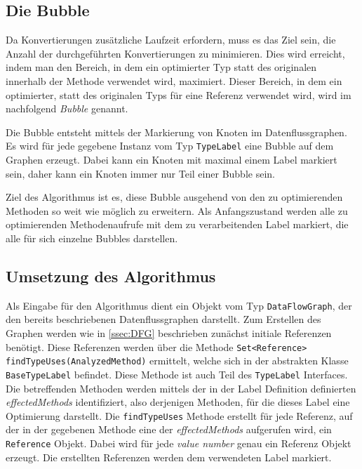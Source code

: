 \subsection{Die Bubble}

Da Konvertierungen zusätzliche Laufzeit erfordern, muss es das Ziel sein, die Anzahl 
der durchgeführten Konvertierungen zu minimieren. Dies wird erreicht, indem man den
Bereich, in dem ein optimierter Typ statt des originalen innerhalb der Methode 
verwendet wird, maximiert. Dieser Bereich, in dem ein optimierter, statt des originalen 
Typs für eine Referenz verwendet wird, wird im nachfolgend \textit{Bubble} genannt. 

Die Bubble entsteht mittels der Markierung von Knoten im Datenflussgraphen. Es wird 
für jede gegebene Instanz vom Typ \texttt{TypeLabel} eine Bubble auf dem Graphen 
erzeugt. Dabei kann ein Knoten mit maximal einem Label markiert sein, daher kann
ein Knoten immer nur Teil einer Bubble sein.

Ziel des Algorithmus ist es, diese Bubble ausgehend von den zu optimierenden Methoden 
so weit wie möglich zu erweitern. Als Anfangszustand werden alle zu optimierenden 
Methodenaufrufe mit dem zu verarbeitenden Label markiert, die alle für sich einzelne
Bubbles darstellen.

\subsection{Umsetzung des Algorithmus}\label{ssec:umAlg}

Als Eingabe für den Algorithmus dient ein Objekt vom Typ \texttt{DataFlowGraph}, der 
den bereits beschriebenen Datenflussgraphen darstellt. Zum Erstellen des Graphen werden
wie in \ref{ssec:DFG} beschrieben zunächst initiale Referenzen benötigt. Diese Referenzen
werden über die Methode \texttt{Set<Reference>} \texttt{findTypeUses(AnalyzedMethod)} ermittelt, 
welche sich in der abstrakten Klasse \texttt{BaseTypeLabel} befindet. Diese Methode ist auch Teil des 
\texttt{TypeLabel} Interfaces. Die betreffenden Methoden werden mittels der in der Label 
Definition definierten \textit{effectedMethods} identifiziert, also derjenigen Methoden, für die dieses 
Label eine Optimierung darstellt. Die \texttt{findTypeUses} Methode erstellt für jede 
Referenz, auf der in der gegebenen Methode eine der \textit{effectedMethods} aufgerufen 
wird, ein \texttt{Reference} Objekt. Dabei wird für jede \textit{value number} genau ein Referenz 
Objekt erzeugt. Die erstellten Referenzen werden dem verwendeten Label markiert.


